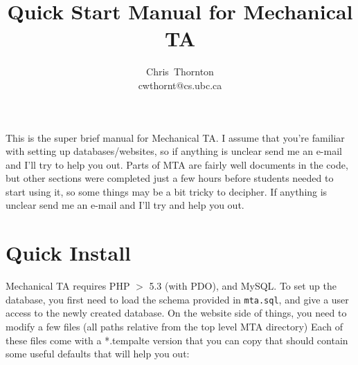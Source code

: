 \documentclass[11pt,letterpaper,oneside]{article}
\begin{document}
\title{Quick Start Manual for Mechanical TA}

\author{
Chris~Thornton\\
cwthornt@cs.ubc.ca
}

\maketitle

\tableofcontents

This is the super brief manual for Mechanical TA. I assume that you're familiar with setting up databases/websites, so if anything is unclear send me an e-mail and I'll try to help you out. Parts of MTA are fairly well documents in the code, but other sections were completed just a few hours before students needed to start using it, so some things may be a bit tricky to decipher. If anything is unclear send me an e-mail and I'll try and help you out.

\section{Quick Install}

Mechanical TA requires PHP $>$ 5.3 (with PDO), and MySQL. To set up the database, you first need to load the schema provided in \texttt{mta.sql}, and give a user access to the newly created database. On the website side of things, you need to modify a few files (all paths relative from the top level MTA directory) Each of these files come with a *.tempalte version that you can copy that should contain some useful defaults that will help you out:
\end{document}
